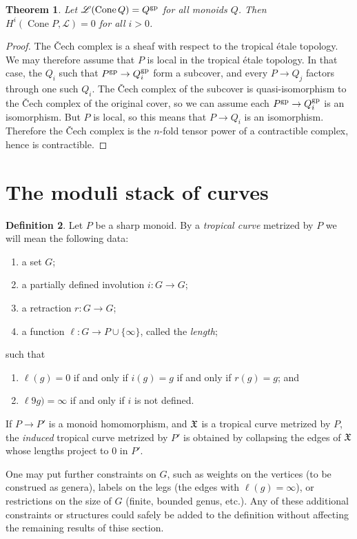 \documentclass[12pt]{amsart}
\newtheorem{theorem}{Theorem}
\theoremstyle{definition}
\newtheorem{definition}[theorem]{Definition}
\theoremstyle{remark}
\def\Cone{\operatorname{Cone}}
\begin{document}
\begin{theorem}
Let $\mathscr L(\Cone Q) = Q^{\rm gp}$ for all monoids $Q$.  Then $H^i(\Cone P, \mathscr L) = 0$ for all $i > 0$.
\end{theorem}
\begin{proof}
The \v Cech complex is a sheaf with respect to the tropical \'etale topology.  We may therefore assume that $P$ is local in the tropical \'etale topology.  In that case, the $Q_i$ such that $P^{\rm gp} \to Q_i^{\rm gp}$ form a subcover, and every $P \to Q_j$ factors through one such $Q_i$.  The \v Cech complex of the subcover is quasi-isomorphism to the \v Cech complex of the original cover, so we can assume each $P^{\rm gp} \to Q_i^{\rm gp}$ is an isomorphism.  But $P$ is local, so this means that $P \to Q_i$ is an isomorphism.  Therefore the \v Cech complex is the $n$-fold tensor power of a contractible complex, hence is contractible.
\end{proof}

\section{The moduli stack of curves}

\begin{definition}
Let $P$ be a sharp monoid.  By a \emph{tropical curve} metrized by $P$ we will mean the following data:
\begin{enumerate}
\item a set $G$;
\item a partially defined involution $i : G \to G$;
\item a retraction $r : G \to G$;
\item a function $\ell : G \to P \cup \{ \infty \}$, called the \emph{length};
\end{enumerate}
such that
\begin{enumerate}[resume*]
\item $\ell(g) = 0$ if and only if $i(g) = g$ if and only if $r(g) = g$; and
\item $\ell9g) = \infty$ if and only if $i$ is not defined.
\end{enumerate}
\end{definition}

If $P \to P'$ is a monoid homomorphism, and $\frak X$ is a tropical curve metrized by $P$, the \emph{induced} tropical curve metrized by $P'$ is obtained by collapsing the edges of $\frak X$ whose lengths project to $0$ in $P'$.

One may put further constraints on $G$, such as weights on the vertices (to be construed as genera), labels on the legs (the edges with $\ell(g) = \infty$), or restrictions on the size of $G$ (finite, bounded genus, etc.).  Any of these additional constraints or structures could safely be added to the definition without affecting the remaining results of thise section.
\end{document}
